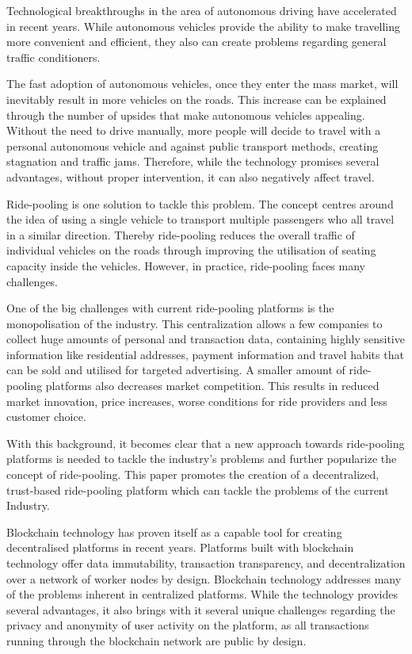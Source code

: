 Technological breakthroughs in the area of autonomous driving have accelerated in recent years.
While autonomous vehicles provide the ability to make travelling more convenient and efficient, they also can create problems regarding general traffic conditioners.

The fast adoption of autonomous vehicles, once they enter the mass market, will inevitably result in more vehicles on the roads. This increase can be explained through the number of upsides that make autonomous vehicles appealing. Without the need to drive manually, more people will decide to travel with a personal autonomous vehicle and against public transport methods, creating stagnation and traffic jams. Therefore, while the technology promises several advantages, without proper intervention, it can also negatively affect  travel.

Ride-pooling is one solution to tackle this problem. The concept centres around the idea of using a single vehicle to transport multiple passengers who all travel in a similar direction. Thereby ride-pooling reduces the overall traffic of individual vehicles on the roads through improving the utilisation of seating capacity inside the vehicles. However, in practice, ride-pooling faces many challenges.

One of the big challenges with current ride-pooling platforms is the monopolisation of the industry.
This centralization allows a few companies to collect huge amounts of personal and transaction data, containing highly sensitive information like residential addresses, payment information and travel habits that can be sold and utilised for targeted advertising.
A smaller amount of ride-pooling platforms also decreases market competition. This results in reduced market innovation, price increases, worse conditions for ride providers and less customer choice. 

With this background, it becomes clear that a new approach towards ride-pooling platforms is needed to tackle the industry's problems and further popularize the concept of ride-pooling. This paper promotes the creation of a decentralized, trust-based ride-pooling platform which can tackle the problems of the current Industry.

Blockchain technology has proven itself as a capable tool for creating decentralised platforms in recent years. Platforms built with blockchain technology offer  data immutability, transaction transparency, and decentralization  over a network of worker nodes by design. Blockchain technology addresses many of the problems inherent in centralized platforms. While the technology provides several advantages, it also brings with it several unique challenges regarding the privacy and anonymity of user activity on the platform, as all transactions running through the blockchain network are public by design.

